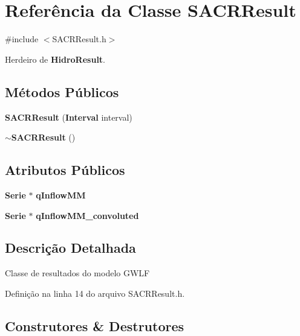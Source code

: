 \section{Referência da Classe S\+A\+C\+R\+Result}
\label{class_s_a_c_r_result}


{\ttfamily \#include $<$S\+A\+C\+R\+Result.\+h$>$}



Herdeiro de {\bf Hidro\+Result}.

\subsection*{Métodos Públicos}
\begin{DoxyCompactItemize}
\item 
{\bf S\+A\+C\+R\+Result} ({\bf Interval} interval)
\item 
{\bf $\sim$\+S\+A\+C\+R\+Result} ()
\end{DoxyCompactItemize}
\subsection*{Atributos Públicos}
\begin{DoxyCompactItemize}
\item 
{\bf Serie} $\ast$ {\bf q\+Inflow\+MM}
\item 
{\bf Serie} $\ast$ {\bf q\+Inflow\+M\+M\+\_\+convoluted}
\end{DoxyCompactItemize}


\subsection{Descrição Detalhada}
Classe de resultados do modelo G\+W\+LF 

Definição na linha 14 do arquivo S\+A\+C\+R\+Result.\+h.



\subsection{Construtores \& Destrutores}
